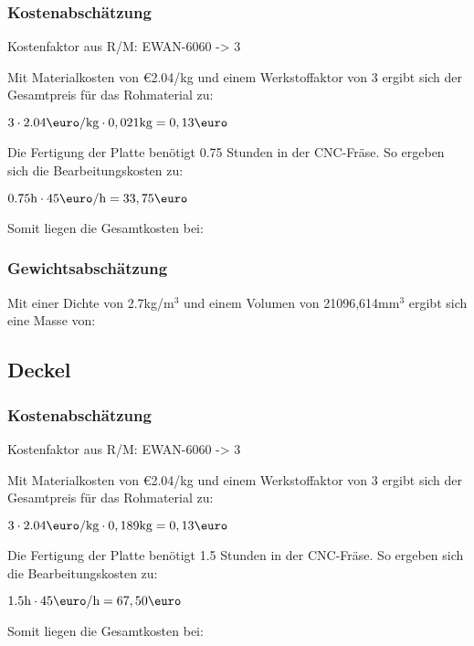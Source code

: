 \documentclass[10pt, a4paper]{article}
\begin{document}
\subsubsection{Kostenabschätzung}
\begin{center}
  Kostenfaktor aus R/M: EWAN-6060 -> 3
\end{center}
Mit Materialkosten von \euro2.04/kg und einem Werkstoffaktor von 3 ergibt sich der Gesamtpreis für das Rohmaterial zu: 
\begin{center}
    $3 \cdot 2.04\text{\euro/kg} \cdot 0,021\text{kg} = 0,13\text{\euro}$
\end{center}
Die Fertigung der Platte benötigt 0.75 Stunden in der CNC-Fräse. So ergeben sich die Bearbeitungskosten zu:
\begin{center}
  $0.75\text{h} \cdot 45\text{\euro/h}= 33,75\text{\euro}$
\end{center}
Somit liegen die Gesamtkosten bei:
\begin{flushright}
\end{flushright}
\subsubsection{Gewichtsabschätzung}
Mit einer Dichte von 2.7kg/m$^3$ und einem Volumen von 21096,614mm$^3$ ergibt sich eine Masse von:
\begin{flushright}
\end{flushright}


\newpage
\subsection{Deckel}
\begin{figure}[h]
  \centering
  \vspace{-10pt}
\end{figure}
\subsubsection{Kostenabschätzung}
\begin{center}
  Kostenfaktor aus R/M: EWAN-6060 -> 3
\end{center}
Mit Materialkosten von \euro2.04/kg und einem Werkstoffaktor von 3 ergibt sich der Gesamtpreis für das Rohmaterial zu: 
\begin{center}
    $3 \cdot 2.04\text{\euro/kg} \cdot 0,189\text{kg} = 0,13\text{\euro}$
\end{center}
Die Fertigung der Platte benötigt 1.5 Stunden in der CNC-Fräse. So ergeben sich die Bearbeitungskosten zu:
\begin{center}
  $1.5\text{h} \cdot 45\text{\euro/h}= 67,50\text{\euro}$
\end{center}
Somit liegen die Gesamtkosten bei:
\begin{flushright}
\end{flushright}
\end{document}
